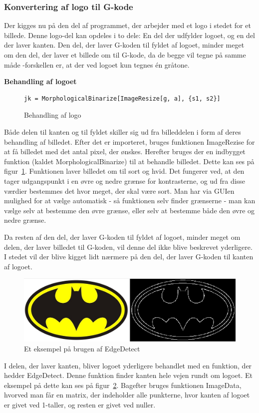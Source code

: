 \subsubsection{Konvertering af logo til G-kode}
Der kigges nu på den del af programmet, der arbejder med et logo i stedet for et billede. Denne logo-del kan opdeles i to dele: En del der udfylder logoet, og en del der laver kanten. Den del, der laver G-koden til fyldet af logoet, minder meget om den del, der laver et billede om til G-kode, da de begge vil tegne på samme måde -forskellen er, at der ved logoet kun tegnes én gråtone. 

\textbf{Behandling af logoet}\\
\begin{figure}[h]
	\begin{lstlisting}
jk = MorphologicalBinarize[ImageResize[g, a], {s1, s2}]
 \end{lstlisting}
	\caption{Behandling af logo}
	\label{fig:jk}
	\end{figure}
Både delen til kanten og til fyldet skiller sig ud fra billeddelen i form af deres behandling af billedet. Efter det er importeret, bruges funktionen ImageRezise for at få billedet med det antal pixel, der ønskes. Herefter bruges der en indbygget funktion (kaldet MorphologicalBinarize) til at behandle billedet. Dette kan ses på figur~\ref{fig:jk}. Funktionen laver billedet om til sort og hvid. Det fungerer ved, at den tager udgangspunkt i en øvre og nedre grænse for kontrasterne, og ud fra disse værdier bestemmes det hvor meget, der skal være sort. Man har via GUIen mulighed for at vælge automatisk - så funktionen selv finder grænserne - man kan vælge selv at bestemme den øvre grænse, eller selv at bestemme både den øvre og nedre grænse.

Da resten af den del, der laver G-koden til fyldet af logoet, minder meget om delen, der laver billedet til G-koden, vil denne del ikke blive beskrevet yderligere. I stedet vil der blive kigget lidt nærmere på den del, der laver G-koden til kanten af logoet.
\begin{figure}[h]
	\begin{center}
	\includegraphics[scale=0.4]{Billeder/edgedetect.jpg}
	\caption{Et eksempel på brugen af EdgeDetect}
	\label{fig:edgedetect}
	\end{center}
\end{figure}
I delen, der laver kanten, bliver logoet yderligere behandlet med en funktion, der hedder EdgeDetect. Denne funktion finder kanten hele vejen rundt om logoet. Et eksempel på dette kan ses på figur~\ref{fig:edgedetect}. Bagefter bruges funktionen ImageData, hvorved man får en matrix, der indeholder alle punkterne, hvor kanten af logoet er givet ved 1-taller, og resten er givet ved nuller.

